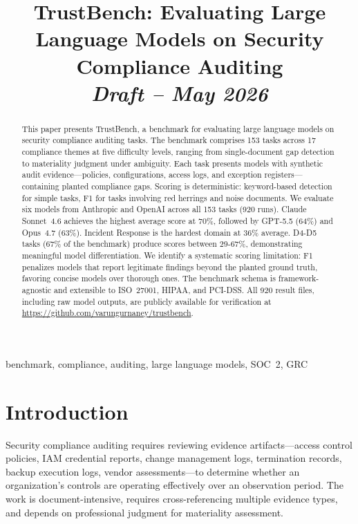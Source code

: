 \documentclass[conference]{IEEEtran}
\begin{document}
\title{TrustBench: Evaluating Large Language Models on Security Compliance Auditing\\{\large\textit{Draft -- May 2026}}}

\author{}

\maketitle

\begin{abstract}
This paper presents TrustBench, a benchmark for evaluating large language models on security compliance auditing tasks. The benchmark comprises 153 tasks across 17 compliance themes at five difficulty levels, ranging from single-document gap detection to materiality judgment under ambiguity. Each task presents models with synthetic audit evidence---policies, configurations, access logs, and exception registers---containing planted compliance gaps. Scoring is deterministic: keyword-based detection for simple tasks, F1 for tasks involving red herrings and noise documents. We evaluate six models from Anthropic and OpenAI across all 153 tasks (920 runs). Claude Sonnet~4.6 achieves the highest average score at 70\%, followed by GPT-5.5 (64\%) and Opus~4.7 (63\%). Incident Response is the hardest domain at 36\% average. D4-D5 tasks (67\% of the benchmark) produce scores between 29-67\%, demonstrating meaningful model differentiation. We identify a systematic scoring limitation: F1 penalizes models that report legitimate findings beyond the planted ground truth, favoring concise models over thorough ones. The benchmark schema is framework-agnostic and extensible to ISO~27001, HIPAA, and PCI-DSS. All 920 result files, including raw model outputs, are publicly available for verification at \url{https://github.com/varungurnaney/trustbench}.
\end{abstract}

\begin{IEEEkeywords}
benchmark, compliance, auditing, large language models, SOC~2, GRC
\end{IEEEkeywords}

\section{Introduction}

Security compliance auditing requires reviewing evidence artifacts---access control policies, IAM credential reports, change management logs, termination records, backup execution logs, vendor assessments---to determine whether an organization's controls are operating effectively over an observation period. The work is document-intensive, requires cross-referencing multiple evidence types, and depends on professional judgment for materiality assessment.
\end{document}
